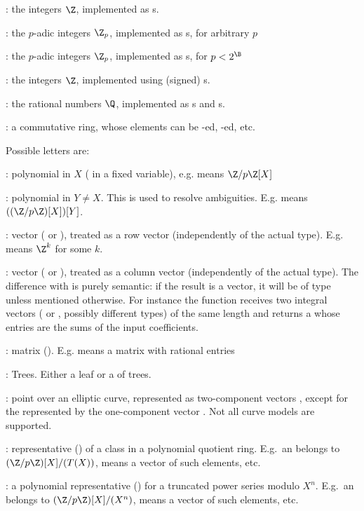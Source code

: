   :  the integers $\Z$, implemented as s.

  : the $p$-adic integers $\Z_p$, implemented as s, for arbitrary $p$

  : the $p$-adic integers $\Z_p$, implemented as s, for $p< 2^{\B}$

  :  the integers $\Z$, implemented using (signed) s.

  :  the rational numbers $\Q$, implemented as s and
s.

  :  a commutative ring, whose elements can be
-ed, -ed, etc.

\noindent Possible letters are:

  : polynomial in $X$ ( in a fixed variable), e.g. 
           means $\Z/p\Z[X]$

  : polynomial in $Y\neq X$. This is used to resolve ambiguities.
           E.g.  means $((\Z/p\Z)[X])[Y]$.

  : vector ( or ), treated as a row vector
  (independently of the actual type). E.g.  means $\Z^k$ for some $k$.

  : vector ( or ), treated as a column vector
  (independently of the actual type). The difference with  is purely
  semantic: if the result is a vector, it will be of type  unless
  mentioned otherwise. For instance the function  receives two
  integral vectors ( or , possibly different types) of the
  same length and returns a  whose entries are the sums of the input
  coefficients.

  : matrix (). E.g.  means a matrix with rational
  entries

  : Trees. Either a leaf or a  of trees.

  : point over an elliptic curve, represented
  as two-component vectors \kbd{[x,y]}, except for the  represented by the
  one-component vector \kbd{[0]}. Not all curve models are supported.

  : representative () of a class in a polynomial quotient ring.
  E.g.~an  belongs to $(\Z/p\Z)[X]/(T(X))$,  means a
  vector of such elements, etc.

  : a polynomial representative () for a truncated power
  series modulo $X^n$. E.g.~an  belongs to $(\Z/p\Z)[X]/(X^n)$,
   means a vector of such elements, etc.

